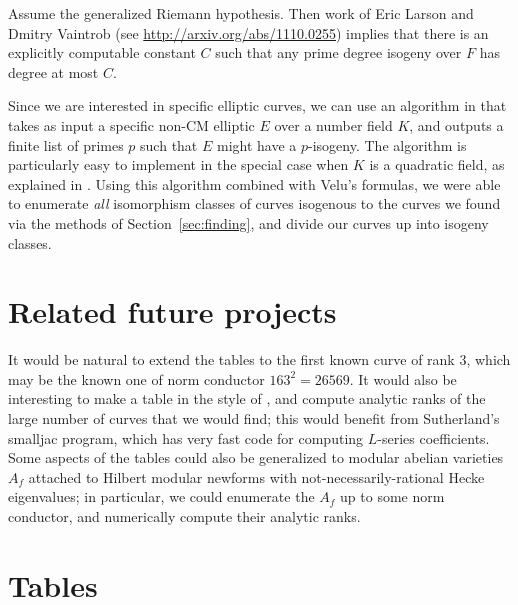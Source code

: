 \documentclass{amsart}
\begin{document}
\begin{remark}
  Assume the generalized Riemann hypothesis.  Then work of Eric Larson
  and Dmitry Vaintrob (see \url{http://arxiv.org/abs/1110.0255})
  implies that there is an explicitly computable constant $C$ such
  that any prime degree isogeny over $F$ has degree at most $C$.
\end{remark}

Since we are interested in specific elliptic curves, 
we can use an algorithm in \cite{billerey:isog}  that takes as
input a specific non-CM elliptic $E$ over a number field $K$, and
outputs a finite list of primes $p$ such that $E$ might have a
$p$-isogeny.  The algorithm is particularly easy to implement in the
special case when $K$ is a quadratic field, as explained in
\cite[\S2.3.4]{billerey:isog}.  Using this algorithm combined with
Velu's formulas, we were able to enumerate {\em all}
isomorphism classes of curves isogenous to the curves we found via the
methods of Section~\ref{sec:finding}, and divide our curves up into
isogeny classes.


\section{Related future projects}\label{sec:future}

It would be natural to extend the tables to the first known curve of
rank $3$, which may be the known one of norm conductor $163^2=26569$.
It would also be interesting to make a table in the style of
\cite{stein-watkins:ants5}, and compute analytic ranks of the large
number of curves that we would find; this would benefit from
Sutherland's smalljac program, which has very fast code for computing
$L$-series coefficients.  Some aspects of the tables could also be
generalized to modular abelian varieties $A_f$ attached to Hilbert
modular newforms with not-necessarily-rational Hecke eigenvalues; in
particular, we could enumerate the $A_f$ up to some norm conductor,
and numerically compute their analytic ranks.

\section{Tables}\label{sec:tables}
\end{document}
